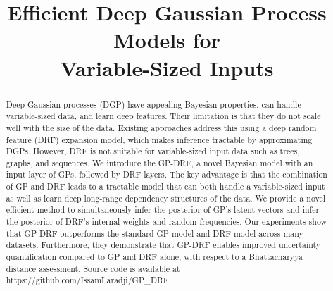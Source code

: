 \documentclass[conference]{IEEEtran}
\begin{document}
\title{Efficient Deep Gaussian Process Models for\\ Variable-Sized Inputs}

\author{
}

\maketitle

\begin{abstract}
Deep Gaussian processes (DGP) have appealing Bayesian properties, can handle variable-sized data, and learn deep features. Their limitation is that they do not scale well with the size of the data. Existing approaches address this using a deep random feature (DRF) expansion model, which makes inference tractable by approximating DGPs. However, DRF is not suitable for variable-sized input data such as trees, graphs, and sequences. We introduce the GP-DRF, a novel Bayesian model with an input layer of GPs, followed by DRF layers. The key advantage is that the combination of GP and DRF leads to a tractable model that can both handle a variable-sized input as well as learn deep long-range dependency structures of the data. We provide a novel efficient method to simultaneously infer the posterior of GP's latent vectors and infer the posterior of DRF's internal weights and random frequencies. Our experiments show that GP-DRF outperforms the standard GP model and DRF model across many datasets. Furthermore, they demonstrate that GP-DRF enables improved uncertainty quantification compared to GP and DRF alone, with respect to a Bhattacharyya distance assessment. Source code is available at { https://github.com/IssamLaradji/GP\_DRF}.


\end{abstract}
\end{document}
